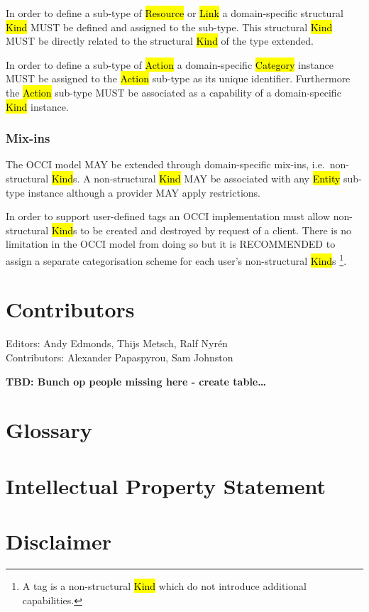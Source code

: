 \documentclass[10pt,a4paper,british]{article}
\begin{document}
In order to define a sub-type of \hl{Resource} or \hl{Link} a domain-specific
structural \hl{Kind} MUST be defined and assigned to the sub-type. This
structural \hl{Kind} MUST be directly related to the structural \hl{Kind} of
the type extended.

In order to define a sub-type of \hl{Action} a domain-specific \hl{Category}
instance MUST be assigned to the \hl{Action} sub-type as its unique identifier.
Furthermore the \hl{Action} sub-type MUST be associated as a capability of a
domain-specific \hl{Kind} instance.

\subsubsection{Mix-ins}
The OCCI model MAY be extended through domain-specific mix-ins,
i.e.~non-structural \hl{Kind}s.  A non-structural \hl{Kind} MAY be associated
with any \hl{Entity} sub-type instance although a provider MAY apply
restrictions.

In order to support user-defined tags an OCCI implementation must allow
non-structural \hl{Kind}s to be created and destroyed by request of a client.
There is no limitation in the OCCI model from doing so but it is RECOMMENDED to
assign a separate categorisation scheme for each user's non-structural
\hl{Kind}s%
\footnote{A tag is a non-structural \hl{Kind} which do not introduce additional
capabilities.}.

\section{Contributors}
Editors: Andy Edmonds, Thijs Metsch, Ralf Nyrén \\
Contributors: Alexander Papaspyrou, Sam Johnston

\textbf{TBD: Bunch op people missing here - create table\ldots}

\section{Glossary}
\label{sec:glossary}



\section{Intellectual Property Statement}


\section{Disclaimer}

\end{document}
